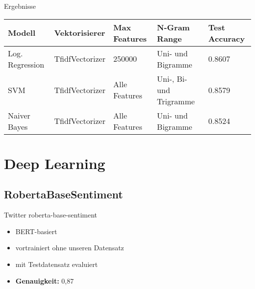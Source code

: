 \documentclass[aspectratio=169]{beamer} %
\begin{document}
\begin{frame}{Ergebnisse}
    \centering
    \scriptsize


    \begin{tabular}{|l|l|l|l|l|}
        \hline
        \textbf{Modell} & \textbf{Vektorisierer} & \textbf{Max Features} & \textbf{N-Gram Range} & \textbf{Test Accuracy} \\
        \hline
        Log. Regression & TfidfVectorizer & 250000 & Uni- und Bigramme & 0.8607 \\
        SVM & TfidfVectorizer & Alle Features & Uni-, Bi- und Trigramme & 0.8579 \\
        Naiver Bayes & TfidfVectorizer & Alle Features & Uni- und Bigramme & 0.8524 \\
        \hline
    \end{tabular}
\end{frame}


\section{Deep Learning}

\subsection{RobertaBaseSentiment}
\begin{frame}{Twitter roberta-base-sentiment}
\begin{itemize}
      \item BERT-basiert
      \item vortrainiert ohne unseren Datensatz
      \item mit Testdatensatz evaluiert
      \vspace{0.5cm}
      \item \textbf{Genauigkeit:} 0,87
  \end{itemize}
\end{frame}
\end{document}
